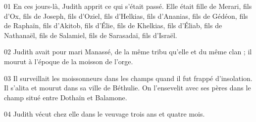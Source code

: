 01 En ces jours-là, Judith apprit ce qui s'était passé. Elle était fille de Merari, fils d'Ox, fils de Joseph, fils d'Oziel, fils d'Helkias, fils d'Ananias, fils de Gédéon, fils de Raphaïn, fils d'Akitob, fils d'Élie, fils de Khelkias, fils d'Éliab, fils de Nathanaël, fils de Salamiel, fils de Sarasadaï, fils d'Israël.

02 Judith avait pour mari Manassé, de la même tribu qu'elle et du même clan ; il mourut à l'époque de la moisson de l'orge.

03 Il surveillait les moissonneurs dans les champs quand il fut frappé d'insolation. Il s'alita et mourut dans sa ville de Béthulie. On l'ensevelit avec ses pères dans le champ situé entre Dothaïn et Balamone.

04 Judith vécut chez elle dans le veuvage trois ans et quatre mois.
